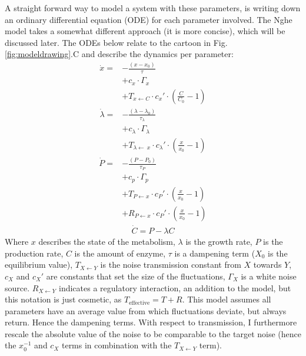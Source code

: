 A straight forward way to model a system with these parameters, is writing down an ordinary differential equation (ODE) for each parameter involved. 
%
The Nghe model takes a somewhat different approach (it is more concise), which will be discussed later.
%
The ODEs below relate to the cartoon in Fig. \ref{fig:modeldrawing}.C
and describe the dynamics per parameter:
%
\begin{align}
\label{myfirstequation}
\dot{x} = & - \frac{(x-x_0)}{\tau}  \nonumber \\ 
          & + c_x \cdot \Gamma_x  \nonumber \\ %
          & + T_{x\leftarrow C} \cdot c_x' \cdot (\frac{C}{C_0} - 1)  
\end{align}
%
%
\begin{align}
	\dot{\lambda} = & -\frac{(\lambda - \lambda_0 )}{\tau_\lambda} \nonumber \\ 
 			& + c_\lambda \cdot \Gamma_\lambda \nonumber \\  %
			& + T_{\lambda\leftarrow\ x} \cdot c_\lambda' \cdot (\frac{x}{x_0}-1) 
\end{align}
%
\begin{align}
\label{mythirdequation}
\dot{P} = & - \frac{(P-P_0)}{\tau_P} \nonumber \\ 
		 & + c_p \cdot \Gamma_p \nonumber \\ 
         & + T_{P\leftarrow x} \cdot c_P' \cdot (\frac{x}{x_0}-1)  \nonumber \\ 
         & + R_{P\leftarrow x} \cdot c_P' \cdot (\frac{x}{x_0}-1)
\end{align}
%
\begin{align}
\label{mylastequation}
\dot{C} = P - \lambda C
\end{align}
%
Where $x$ describes the state of the metabolism, $\lambda$ is the growth rate, $P$ is the production rate, $C$ is the amount of enzyme, $\tau$ is a dampening term ($X_0$ is the equilibrium value), $T_{X \leftarrow Y}$ is the noise transmission constant from $X$ towards $Y$, $c_X$ and $c_X'$ are constants that set the size of the fluctuations, $\Gamma_X$ is a white noise source.
$R_{X \leftarrow Y}$ indicates a regulatory interaction, an addition to the model, but this notation is just cosmetic, as $T_\text{effective}=T+R$.
%
This model assumes all parameters have an average value from which fluctuations deviate, but always return. Hence the dampening terms.
With respect to transmission, I furthermore rescale the absolute value of the noise to be comparable to the target noise (hence the $x_0^{-1}$ and $c_X$ terms in combination with the $T_{X\leftarrow Y}$ term).

